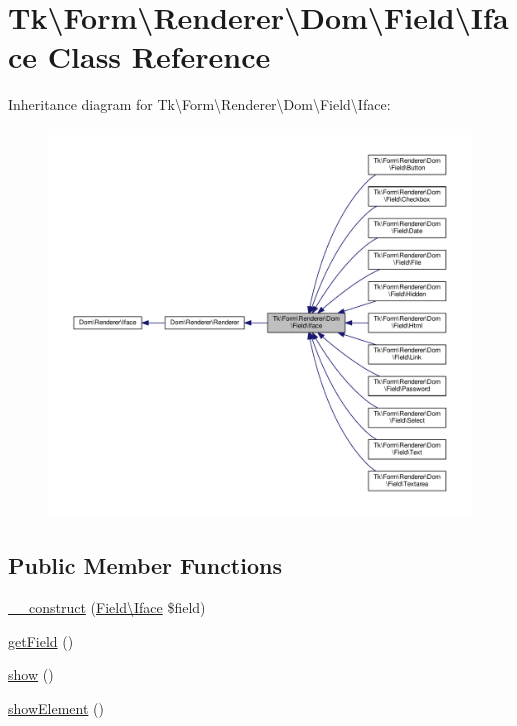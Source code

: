 \hypertarget{classTk_1_1Form_1_1Renderer_1_1Dom_1_1Field_1_1Iface}{\section{Tk\textbackslash{}Form\textbackslash{}Renderer\textbackslash{}Dom\textbackslash{}Field\textbackslash{}Iface Class Reference}
\label{classTk_1_1Form_1_1Renderer_1_1Dom_1_1Field_1_1Iface}
}


Inheritance diagram for Tk\textbackslash{}Form\textbackslash{}Renderer\textbackslash{}Dom\textbackslash{}Field\textbackslash{}Iface\+:\nopagebreak
\begin{figure}[H]
\begin{center}
\leavevmode
\includegraphics[width=350pt]{classTk_1_1Form_1_1Renderer_1_1Dom_1_1Field_1_1Iface__inherit__graph}
\end{center}
\end{figure}
\subsection*{Public Member Functions}
\begin{DoxyCompactItemize}
\item 
\hyperlink{classTk_1_1Form_1_1Renderer_1_1Dom_1_1Field_1_1Iface_ae9df61fb81750b399bf0c27b1ca5d4f1}{\+\_\+\+\_\+construct} (\hyperlink{classTk_1_1Form_1_1Renderer_1_1Dom_1_1Field_1_1Iface}{Field\textbackslash{}\+Iface} \$field)
\item 
\hyperlink{classTk_1_1Form_1_1Renderer_1_1Dom_1_1Field_1_1Iface_ae4a35c133973445da3324bf3b7ce9fab}{get\+Field} ()
\item 
\hyperlink{classTk_1_1Form_1_1Renderer_1_1Dom_1_1Field_1_1Iface_a77359df4fad53376f97b6a192410c54b}{show} ()
\item 
\hyperlink{classTk_1_1Form_1_1Renderer_1_1Dom_1_1Field_1_1Iface_ab060b02a360a0dfbdbff8d883a4d1b0c}{show\+Element} ()
\end{DoxyCompactItemize}
